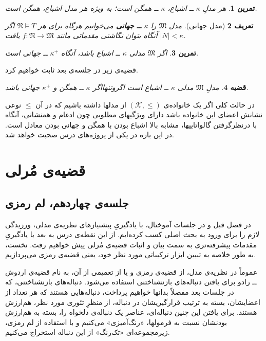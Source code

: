 \documentclass[12pt,a4paper]{report}
\theoremstyle{colorhead}
\newtheorem{thm}{قضیه}
\newtheorem{tam}[thm]{تمرین}
\newtheorem{defn}[thm]{تعریف}
\begin{document}
\begin{tam}
هر مدلِ
$\kappa$
ــ
اشباع،
$\kappa$
ــ
همگن است؛ به ویژه هر مدل اشباع، همگن است.
\end{tam}
\begin{defn}[مدل جهانی]
مدل
$\mathfrak{M}$
را
\textbf{$\kappa$
ــ
جهانی }
می‌خوانیم هرگاه برای هر
$\mathfrak{N}\models T$
اگر
$|N|<\kappa$
آنگاه بتوان نگاشتی مقدماتی مانند
$f:\mathfrak{N}\to \mathfrak{M}$
یافت.
\end{defn}
\begin{tam}
اگر
$\mathfrak{M}$
مدلی
$\kappa$ ــ
اشباع باشد، آنگاه 
$\kappa^+$
ــ 
جهانی است.
\end{tam}
قضیه‌ی زیر در جلسه‌ی بعد ثابت خواهیم کرد.
\begin{thm}
مدلِ
$\mathfrak{M}$
مدلی
$\kappa$ ــ
اشباع است اگروتنهااگر
$\kappa$
ــ
همگن و 
$\kappa^+$
جهانی باشد.
\end{thm}
در حالت کلی اگر یک
خانواده‌ی
$(\mathcal{K},\leq)$
از مدلها
داشته باشیم که در آن
$\leq$
نوعی نشانش اعضای این خانواده باشد دارای ویژگیهای مطلوبی چون ادغام و  همنشانی،
آنگاه با درنظرگرفتن
گالواتایپها،   مشابه بالا 
اشباع بودن با همگن و جهانی بودن معادل است. در این باره در یکی از پروژه‌های درس صحبت خواهد شد. 
\chapter{قضیه‌ی مُرلی}
\section{جلسه‌ی چهاردهم،‌ لم رمزی}
در فصل قبل 
و در جلسات آموختال،
با یادگیریِ پیشنیازهای نظریه‌ی مدلی، ورزیدگی لازم  را برای 
 ورود به بحث اصلی کسب کرده‌ایم. 
از این نقطه‌ی درس به بعد با یادگیریِ 
مقدمات پیشرفته‌تری به سمت بیان و
اثبات قضیه‌ی مُرلی پیش خواهیم رفت.  نخست، به طور خلاصه به تبیین  ابزار ترکیباتی مورد نظر خود، یعنی قضیه‌ی رمزی می‌پردازیم.
\par 
عموماً در نظریه‌ی مدل، از قضیه‌ی رمزی
 و یا از تعمیمی از آن، به نام قضیه‌ی اردوش ــ‌ رادو
 برای یافتن دنباله‌های بازنشناختنی استفاده می‌شود. دنباله‌های بازنشناختنی، که در جلسات بعد مفصلاً  بدانها خواهیم پرداخت، دنباله‌هایی هستند که هر تعداد از اعضایشان، بسته به ترتیب 
 قرارگیریشان در دنباله،
از منظرِ تئوری مورد نظر، هم‌ارزش هستند. برای  یافتن این چنین دنباله‌ای، 
 عناصر یک دنباله‌ی دلخواه را،‌ بسته‌ به هم‌ارزش بودنشان نسبت به فرمولها، «رنگ‌آمیزی» می‌کنیم و با استفاده از لم‌ رمزی، زیرمجموعه‌ای «تک‌رنگ» از این دنباله استخراج می‌کنیم. 
\end{document}

